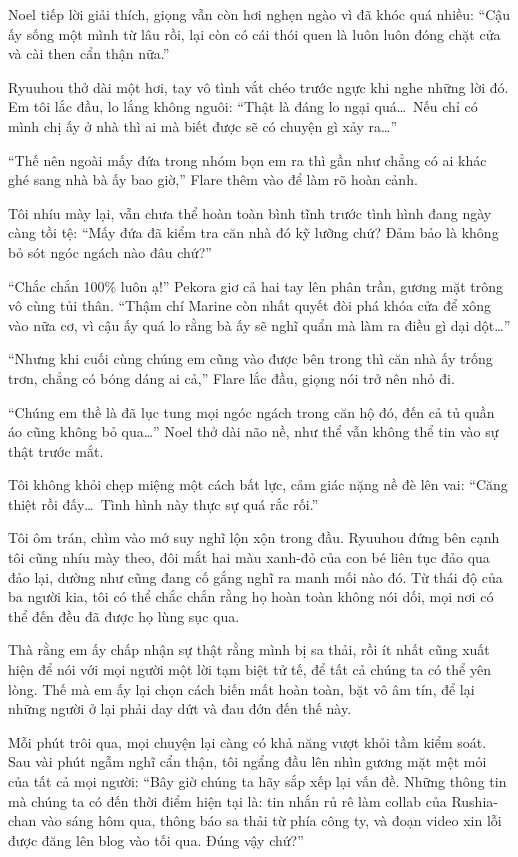 \documentclass[../main.tex]{subfiles}
\begin{document}
Noel tiếp lời giải thích, giọng vẫn còn hơi nghẹn ngào vì đã khóc quá nhiều: ``Cậu ấy sống một mình từ lâu rồi, lại còn có cái thói quen là luôn luôn đóng chặt cửa và cài then cẩn thận nữa.''

Ryuuhou thở dài một hơi, tay vô tình vắt chéo trước ngực khi nghe những lời đó. Em tôi lắc đầu, lo lắng không nguôi: ``Thật là đáng lo ngại quá\dots\ Nếu chỉ có mình chị ấy ở nhà thì ai mà biết được sẽ có chuyện gì xảy ra\dots''

``Thế nên ngoài mấy đứa trong nhóm bọn em ra thì gần như chẳng có ai khác ghé sang nhà bà ấy bao giờ,'' Flare thêm vào để làm rõ hoàn cảnh.

Tôi nhíu mày lại, vẫn chưa thể hoàn toàn bình tĩnh trước tình hình đang ngày càng tồi tệ: ``Mấy đứa đã kiểm tra căn nhà đó kỹ lưỡng chứ? Đảm bảo là không bỏ sót ngóc ngách nào đâu chứ?''

``Chắc chắn 100\% luôn ạ!'' Pekora giơ cả hai tay lên phân trần, gương mặt trông vô cùng tủi thân. ``Thậm chí Marine còn nhất quyết đòi phá khóa cửa để xông vào nữa cơ, vì cậu ấy quá lo rằng bà ấy sẽ nghĩ quẩn mà làm ra điều gì dại dột\dots''

``Nhưng khi cuối cùng chúng em cũng vào được bên trong thì căn nhà ấy trống trơn, chẳng có bóng dáng ai cả,'' Flare lắc đầu, giọng nói trở nên nhỏ đi.

``Chúng em thề là đã lục tung mọi ngóc ngách trong căn hộ đó, đến cả tủ quần áo cũng không bỏ qua\dots'' Noel thở dài não nề, như thể vẫn không thể tin vào sự thật trước mắt.

Tôi không khỏi chẹp miệng một cách bất lực, cảm giác nặng nề đè lên vai: ``Căng thiệt rồi đấy\dots\ Tình hình này thực sự quá rắc rối.''

Tôi ôm trán, chìm vào mớ suy nghĩ lộn xộn trong đầu. Ryuuhou đứng bên cạnh tôi cũng nhíu mày theo, đôi mắt hai màu xanh-đỏ của con bé liên tục đảo qua đảo lại, dường như cũng đang cố gắng nghĩ ra manh mối nào đó. Từ thái độ của ba người kia, tôi có thể chắc chắn rằng họ hoàn toàn không nói dối, mọi nơi có thể đến đều đã được họ lùng sục qua.

Thà rằng em ấy chấp nhận sự thật rằng mình bị sa thải, rồi ít nhất cũng xuất hiện để nói với mọi người một lời tạm biệt tử tế, để tất cả chúng ta có thể yên lòng. Thế mà em ấy lại chọn cách biến mất hoàn toàn, bặt vô âm tín, để lại những người ở lại phải day dứt và đau đớn đến thế này.

Mỗi phút trôi qua, mọi chuyện lại càng có khả năng vượt khỏi tầm kiểm soát. Sau vài phút ngẫm nghĩ cẩn thận, tôi ngẩng đầu lên nhìn gương mặt mệt mỏi của tất cả mọi người: ``Bây giờ chúng ta hãy sắp xếp lại vấn đề. Những thông tin mà chúng ta có đến thời điểm hiện tại là: tin nhắn rủ rê làm collab của Rushia-chan vào sáng hôm qua, thông báo sa thải từ phía công ty, và đoạn video xin lỗi được đăng lên blog vào tối qua. Đúng vậy chứ?''
\end{document}
